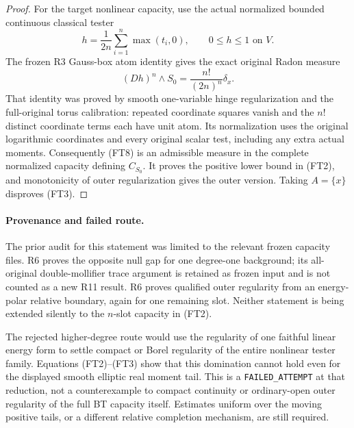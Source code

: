 \documentclass[11pt,a4paper]{article}
\numberwithin{equation}{section}
\theoremstyle{definition}
\theoremstyle{remark}
\begin{document}
\begin{proof}
For the target nonlinear capacity, use the actual normalized
bounded continuous classical tester
\[
                 h=\frac1{2n}\sum_{i=1}^n\max(t_i,0),
                          \qquad0\leq h\leq1\text{ on }V.
\]
The frozen R3 Gauss-box atom identity
 gives the exact original
Radon measure
\[
                  (Dh)^n\wedge S_0
                           =\frac{n!}{(2n)^n}\delta_x.
 \tag{FT8}
\]
That identity was proved by smooth one-variable hinge
regularization and the full-original torus calibration:
repeated coordinate squares vanish and the $n!$ distinct
coordinate terms each have unit atom. Its normalization
uses the original logarithmic coordinates and every original
scalar test, including any extra actual moments.
Consequently (FT8) is an admissible measure in the complete
normalized capacity defining $C_{S_0}$. It proves the positive
lower bound in (FT2), and monotonicity of outer regularization
gives the outer version. Taking $A=\{x\}$ disproves (FT3).
\end{proof}

\paragraph{Provenance and failed route.}
The prior audit for this statement was limited to the relevant
frozen capacity files. R6
 proves the opposite
null gap for one degree-one background; its all-original
double-mollifier trace argument is retained as frozen input
and is not counted as a new R11 result. R6
 proves qualified
outer regularity from an energy-polar relative boundary,
again for one remaining slot. Neither statement is being
extended silently to the $n$-slot capacity in (FT2).

The rejected higher-degree route would use the regularity of
one faithful linear energy form to settle compact or Borel
regularity of the entire nonlinear tester family. Equations
(FT2)--(FT3) show that this domination cannot hold even for
the displayed smooth elliptic real moment tail. This is a
\texttt{FAILED\_ATTEMPT} at that reduction, not a
counterexample to compact continuity or ordinary-open outer
regularity of the full BT capacity itself. Estimates uniform
over the moving positive tails, or a different relative
completion mechanism, are still required.



\end{document}
